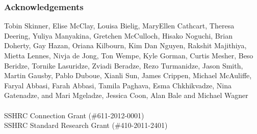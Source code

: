 \documentclass{beamer}
\begin{document}
\begin{frame}
\frametitle{Acknowledgements}


Tobin Skinner, Elise McClay, Louisa Bielig, MaryEllen Cathcart, Theresa Deering, Yuliya Manyakina, Gretchen
McCulloch, Hisako Noguchi, Brian Doherty, Gay Hazan, Oriana Kilbourn, Kim Dan
Nguyen, Rakshit Majithiya, Mietta Lennes, Nivja de Jong, Ton Wempe, Kyle
Gorman, Curtis Mesher, Beso Beridze, Tornike Lasuridze, Zviadi Beradze, Rezo
Turmanidze, Jason Smith, Martin Gausby, Pablo Duboue, Xianli Sun, James Crippen,
Michael McAuliffe, Faryal
Abbasi, Farah Abbasi, Tamila Paghava, Esma Chkhikvadze, Nina Gatenadze, and
Mari Mgeladze, Jessica Coon, Alan Bale and Michael
Wagner 
~\\
~\\
SSHRC Connection Grant (\#611-2012-0001) \\
 SSHRC
Standard Research Grant (\#410-2011-2401) 
\end{frame}
\end{document}
